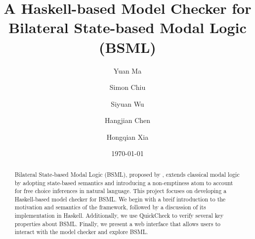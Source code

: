 \documentclass[12pt,a4paper]{article}
\title{A Haskell-based Model Checker for Bilateral State-based Modal Logic (BSML)}
\author{Yuan Ma \and Simon Chiu \and Siyuan Wu \and Hangjian Chen \and Hongqian Xia}
\date{\today}
\begin{document}
\maketitle

\begin{abstract}

    Bilateral State-based Modal Logic (BSML), proposed by \citet{Aloni2024}, 
    extends classical modal logic by adopting state-based semantics and introducing a non-emptiness atom to account for free choice inferences in natural language. 
    This project focuses on developing a Haskell-based model checker for BSML.\@  
    We begin with a breif introduction to the motivation and semantics of the framework, followed by a discussion of its implementation in Haskell.\@ 
    Additionally, we use QuickCheck to verify several key properties about BSML.\@ 
    Finally, we present a web interface that allows users to interact with the model checker and explore BSML.\@

\end{abstract}


\tableofcontents

\clearpage





















\end{document}
